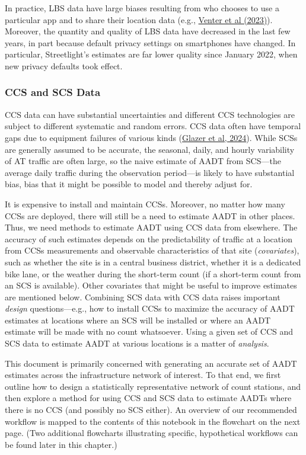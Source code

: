 \documentclass[11pt]{article}
\begin{document}
In practice, LBS data have large biases resulting from who chooses to
use a particular app and to share their location data (e.g.,
\href{https://www.sciencedirect.com/science/article/pii/S0169204623000051}{Venter
et al (2023)}). Moreover, the quantity and quality of LBS data have
decreased in the last few years, in part because default privacy
settings on smartphones have changed. In particular, Streetlight's
estimates are far lower quality since January 2022, when new privacy
defaults took effect.

\subsubsection{CCS and SCS Data}\label{ccs-and-scs-data}

CCS data can have substantial uncertainties and different CCS
technologies are subject to different systematic and random errors. CCS
data often have temporal gaps due to equipment failures of various kinds
(\href{https://www.researchgate.net/publication/377362665_DATA_CHECKS_FOR_BICYCLE_AND_PEDESTRIAN_COUNTS}{Glazer
et al, 2024}). While SCSs are generally assumed to be accurate, the
seasonal, daily, and hourly variability of AT traffic are often large,
so the naive estimate of AADT from SCS---the average daily traffic
during the observation period---is likely to have substantial bias, bias
that it might be possible to model and thereby adjust for.

It is expensive to install and maintain CCSs. Moreover, no matter how
many CCSs are deployed, there will still be a need to estimate AADT in
other places. Thus, we need methods to estimate AADT using CCS data from
elsewhere. The accuracy of such estimates depends on the predictability
of traffic at a location from CCSs measurements and observable
characteristics of that site (\emph{covariates}), such as whether the
site is in a central business district, whether it is a dedicated bike
lane, or the weather during the short-term count (if a short-term count
from an SCS is available). Other covariates that might be useful to
improve estimates are mentioned below. Combining SCS data with CCS data
raises important \emph{design} questions---e.g., how to install CCSs to
maximize the accuracy of AADT estimates at locations where an SCS will
be installed or where an AADT estimate will be made with no count
whatsoever. Using a given set of CCS and SCS data to estimate AADT at
various locations is a matter of \emph{analysis}.

This document is primarily concerned with generating an accurate set of
AADT estimates across the infrastructure network of interest. To that
end, we first outline how to design a statistically representative
network of count stations, and then explore a method for using CCS and
SCS data to estimate AADTs where there is no CCS (and possibly no SCS
either).
An overview of our recommended workflow is mapped to the contents of this notebook in the flowchart on the next page. (Two additional flowcharts illustrating specific, hypothetical workflows can be found later in this chapter.)
\end{document}
